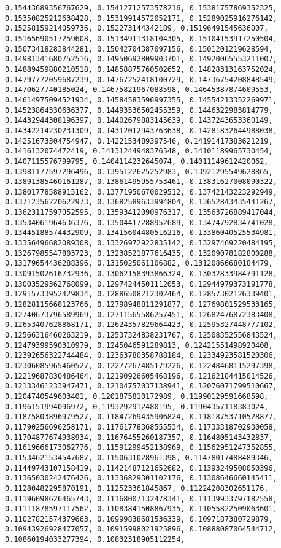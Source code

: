 \documentclass[11pt]{article}
\begin{document}
\begin{Verbatim}[commandchars=\\\{\}]
0.15443689356767629, 0.15412712573578216, 0.15381757869352325, 0.15350825212638428, 0.15319914572052171, 0.15289025916276142, 0.15258159214059736, 0.152273144342189, 0.15196491545636007, 0.15165690517259608, 0.15134911318104305, 0.15104153917250504, 0.15073418283844281, 0.15042704387097156, 0.1501201219628594, 0.14981341680752516, 0.14950692809903701, 0.14920065553211007, 0.14889459880210518, 0.14858875760502652, 0.14828313163752024, 0.14797772059687239, 0.14767252418100729, 0.14736754208848549, 0.1470627740185024, 0.14675821967088598, 0.14645387874609553, 0.14614975094521934, 0.14584583596997355, 0.14554213352269971, 0.14523864330636377, 0.14493536502455359, 0.1446322983814779, 0.14432944308196397, 0.14402679883145639, 0.1437243653360149, 0.14342214230231309, 0.14312012943763638, 0.14281832644988038, 0.14251673304754947, 0.1422153489397546, 0.14191417383621219, 0.1416132074472419, 0.14131244948376548, 0.14101189965730454, 0.1407115576799795, 0.1404114232645074, 0.14011149612420062, 0.13981177597296496, 0.1395122625252983, 0.13921295549628865, 0.13891385460161287, 0.13861495955753461, 0.13831627008090322, 0.13801778588915162, 0.13771950670029512, 0.13742143223292949, 0.13712356220622973, 0.13682589633994804, 0.13652843435441267, 0.13623117597052595, 0.13593412090976317, 0.13563726889417044, 0.13534061964636376, 0.13504417288952689, 0.13474792834741028, 0.13445188574432909, 0.13415604480516216, 0.13386040525534981, 0.13356496682089308, 0.13326972922835142, 0.13297469220484195, 0.13267985547803723, 0.13238521877616435, 0.13209078182800288, 0.13179654436288396, 0.1315025061106882, 0.13120866680184479, 0.13091502616732936, 0.13062158393866324, 0.13032833984791128, 0.13003529362768099, 0.12974244501112053, 0.12944979373191778, 0.12915733952429834, 0.12886508212302464, 0.12857302126339401, 0.12828115668123766, 0.12798948811291877, 0.12769801529533165, 0.12740673796589969, 0.12711565586257451, 0.12682476872383408, 0.12653407628868171, 0.12624357829664423, 0.12595327448777102, 0.12566316460263219, 0.12537324838231767, 0.12508352556843524, 0.12479399590310979, 0.1245046591289813, 0.12421551498920408, 0.12392656322744484, 0.12363780358788184, 0.12334923581520306, 0.12306085965460527, 0.12277267485179226, 0.12248468115297398, 0.12219687830486464, 0.12190926605468196, 0.12162184415014526, 0.12133461233947471, 0.12104757037138941, 0.12076071799510667, 0.1204740549603401, 0.1201875810172989, 0.11990129591668598, 0.1196151994096972, 0.1193292912480195, 0.11904357118383024, 0.11875803896979527, 0.11847269435906824, 0.11818753710528877, 0.11790256696258171, 0.11761778368555534, 0.11733318702930058, 0.11704877674938934, 0.11676455260187357, 0.1164805143432837, 0.11619666173062776, 0.11591299452138969, 0.11562951247352855, 0.11534621534547687, 0.1150631028961398, 0.11478017488489346, 0.11449743107158419, 0.11421487121652682, 0.11393249508050396, 0.11365030242476426, 0.11336829301102176, 0.11308646660145411, 0.11280482295870191, 0.112523361845867, 0.11224208302651176, 0.11196098626465743, 0.11168007132478341, 0.11139933797182558, 0.11111878597117562, 0.11083841508867935, 0.11055822509063601, 0.11027821574379663, 0.10999838681536339, 0.1097187380729879, 0.10943926928477057, 0.10915998021925896, 0.10888087064544712, 0.10860194033277394, 0.10832318905112254, 
\end{Verbatim}
\end{document}
